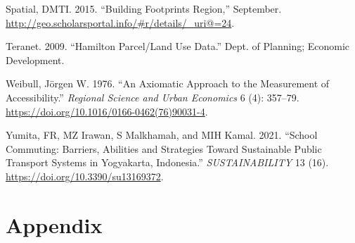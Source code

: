 \documentclass[
default
]{sn-jnl}
\newlength{\cslhangindent}
\newenvironment{CSLReferences}[2] %
 {\begin{list}{}{%
  \setlength{\itemindent}{0pt}
  \setlength{\leftmargin}{0pt}
  \setlength{\parsep}{0pt}
  \ifodd #1
   \setlength{\leftmargin}{\cslhangindent}
   \setlength{\itemindent}{-1\cslhangindent}
  \fi
  \setlength{\itemsep}{#2\baselineskip}}}
 {\end{list}}
\begin{document}
\begin{CSLReferences}{1}{0}
Spatial, DMTI. 2015. {``Building Footprints Region,''} September.
\url{http://geo.scholarsportal.info/\#r/details/_uri@=24}.

Teranet. 2009. {``Hamilton Parcel/Land Use Data.''} Dept. of Planning;
Economic Development.

Weibull, Jörgen W. 1976. {``An Axiomatic Approach to the Measurement of
Accessibility.''} \emph{Regional Science and Urban Economics} 6 (4):
357--79. \url{https://doi.org/10.1016/0166-0462(76)90031-4}.

Yumita, FR, MZ Irawan, S Malkhamah, and MIH Kamal. 2021. {``School
Commuting: Barriers, Abilities and Strategies Toward Sustainable Public
Transport Systems in Yogyakarta, Indonesia.''} \emph{{SUSTAINABILITY}}
13 (16). \url{https://doi.org/10.3390/su13169372}.

\end{CSLReferences}

\pagebreak

\section{Appendix}\label{appendix}


\end{document}
